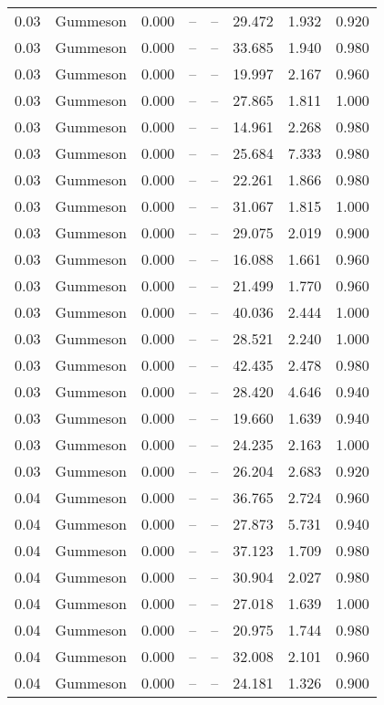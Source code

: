 \begin{table}[H]
\begin{tabular}{l c l l l}
0.03 & Gummeson & 0.000 & -- & -- & 29.472 & 1.932 & 0.920 \\
0.03 & Gummeson & 0.000 & -- & -- & 33.685 & 1.940 & 0.980 \\
0.03 & Gummeson & 0.000 & -- & -- & 19.997 & 2.167 & 0.960 \\
0.03 & Gummeson & 0.000 & -- & -- & 27.865 & 1.811 & 1.000 \\
0.03 & Gummeson & 0.000 & -- & -- & 14.961 & 2.268 & 0.980 \\
0.03 & Gummeson & 0.000 & -- & -- & 25.684 & 7.333 & 0.980 \\
0.03 & Gummeson & 0.000 & -- & -- & 22.261 & 1.866 & 0.980 \\
0.03 & Gummeson & 0.000 & -- & -- & 31.067 & 1.815 & 1.000 \\
0.03 & Gummeson & 0.000 & -- & -- & 29.075 & 2.019 & 0.900 \\
0.03 & Gummeson & 0.000 & -- & -- & 16.088 & 1.661 & 0.960 \\
0.03 & Gummeson & 0.000 & -- & -- & 21.499 & 1.770 & 0.960 \\
0.03 & Gummeson & 0.000 & -- & -- & 40.036 & 2.444 & 1.000 \\
0.03 & Gummeson & 0.000 & -- & -- & 28.521 & 2.240 & 1.000 \\
0.03 & Gummeson & 0.000 & -- & -- & 42.435 & 2.478 & 0.980 \\
0.03 & Gummeson & 0.000 & -- & -- & 28.420 & 4.646 & 0.940 \\
0.03 & Gummeson & 0.000 & -- & -- & 19.660 & 1.639 & 0.940 \\
0.03 & Gummeson & 0.000 & -- & -- & 24.235 & 2.163 & 1.000 \\
0.03 & Gummeson & 0.000 & -- & -- & 26.204 & 2.683 & 0.920 \\
0.04 & Gummeson & 0.000 & -- & -- & 36.765 & 2.724 & 0.960 \\
0.04 & Gummeson & 0.000 & -- & -- & 27.873 & 5.731 & 0.940 \\
0.04 & Gummeson & 0.000 & -- & -- & 37.123 & 1.709 & 0.980 \\
0.04 & Gummeson & 0.000 & -- & -- & 30.904 & 2.027 & 0.980 \\
0.04 & Gummeson & 0.000 & -- & -- & 27.018 & 1.639 & 1.000 \\
0.04 & Gummeson & 0.000 & -- & -- & 20.975 & 1.744 & 0.980 \\
0.04 & Gummeson & 0.000 & -- & -- & 32.008 & 2.101 & 0.960 \\
0.04 & Gummeson & 0.000 & -- & -- & 24.181 & 1.326 & 0.900 \\

\end{tabular}
\end{table}

